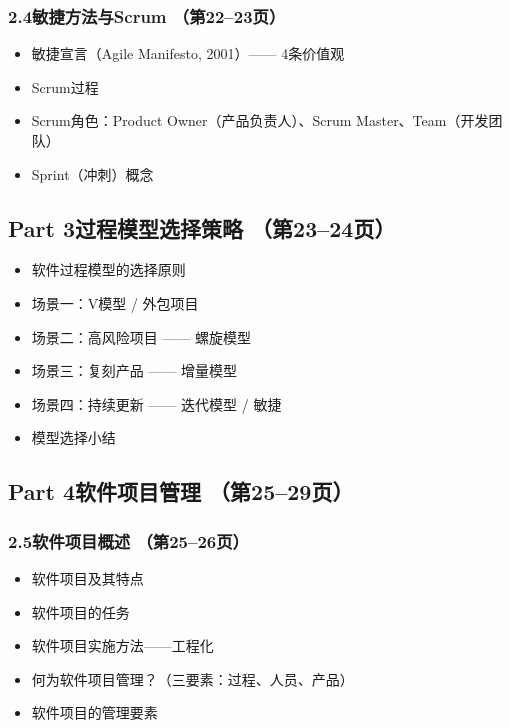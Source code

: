 \documentclass[12pt,a4paper]{ctexart}
\begin{document}
\subsubsection{2.4\quad 敏捷方法与Scrum \hfill（第22--23页）}
\begin{itemize}
    \item 敏捷宣言（Agile Manifesto, 2001）—— 4条价值观
    \item Scrum过程
    \item Scrum角色：Product Owner（产品负责人）、Scrum Master、Team（开发团队）
    \item Sprint（冲刺）概念
\end{itemize}

\subsection{Part 3\quad 过程模型选择策略 \hfill（第23--24页）}
\begin{itemize}
    \item 软件过程模型的选择原则
    \item 场景一：V模型 / 外包项目
    \item 场景二：高风险项目 —— 螺旋模型
    \item 场景三：复刻产品 —— 增量模型
    \item 场景四：持续更新 —— 迭代模型 / 敏捷
    \item 模型选择小结
\end{itemize}

\subsection{Part 4\quad 软件项目管理 \hfill（第25--29页）}

\subsubsection{2.5\quad 软件项目概述 \hfill（第25--26页）}
\begin{itemize}
    \item 软件项目及其特点
    \item 软件项目的任务
    \item 软件项目实施方法——工程化
    \item 何为软件项目管理？（三要素：过程、人员、产品）
    \item 软件项目的管理要素
\end{itemize}
\end{document}
